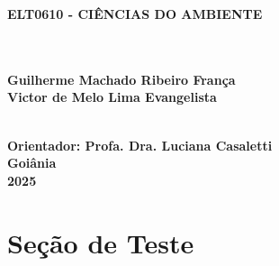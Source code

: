 \documentclass[a4paper, 12pt]{article}
\begin{document}
\begin{center}
    \textbf{ELT0610 - CIÊNCIAS DO AMBIENTE}\\
    \vspace{3cm}

    \textbf{}\\
    \textbf{}\\
    \textbf{Guilherme Machado Ribeiro França}\\
    \textbf{Victor de Melo Lima Evangelista}\\
    \textbf{}\\
    \vspace{3cm}

    \textbf{Orientador: Profa. Dra. Luciana Casaletti}\\
    \vspace*{2cm}
    \textbf{Goiânia}\\
    \textbf{2025\\}

    \section{Seção de Teste}

\end{center}
\end{document}
